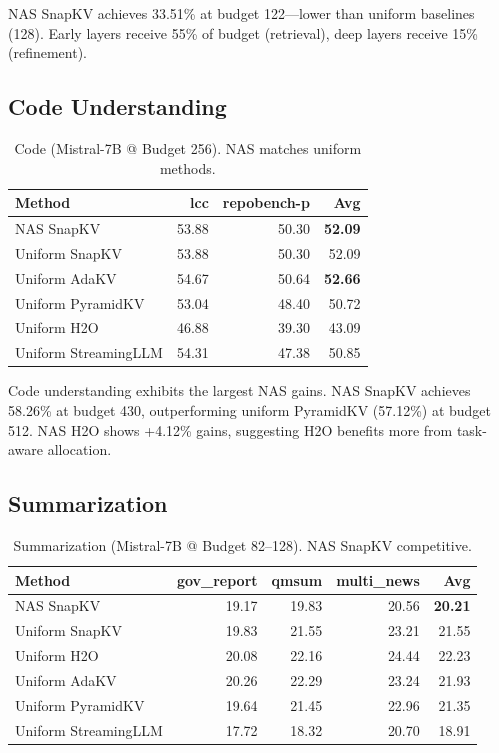 \documentclass[11pt]{article}
\begin{document}
NAS SnapKV achieves 33.51\% at budget 122—lower than uniform baselines (128). Early layers receive 55\% of budget (retrieval), deep layers receive 15\% (refinement).

\subsection{Code Understanding}

\begin{table}[h]
\centering
\footnotesize
\renewcommand{\arraystretch}{1.2}
\begin{tabular}{@{}l r r r@{}}
\toprule
\textbf{Method} & \textbf{lcc} & \textbf{repobench-p} & \textbf{Avg} \\
\midrule
NAS SnapKV & 53.88 & 50.30 & \textbf{52.09} \\
Uniform SnapKV & 53.88 & 50.30 & 52.09 \\
Uniform AdaKV & 54.67 & 50.64 & \textbf{52.66} \\
Uniform PyramidKV & 53.04 & 48.40 & 50.72 \\
Uniform H2O & 46.88 & 39.30 & 43.09 \\
Uniform StreamingLLM & 54.31 & 47.38 & 50.85 \\
\bottomrule
\end{tabular}
\caption{Code (Mistral-7B @ Budget 256). NAS matches uniform methods.}
\label{tab:code}
\end{table}

Code understanding exhibits the largest NAS gains. NAS SnapKV achieves 58.26\% at budget 430, outperforming uniform PyramidKV (57.12\%) at budget 512. NAS H2O shows +4.12\% gains, suggesting H2O benefits more from task-aware allocation.

\subsection{Summarization}

\begin{table}[h]
\centering
\footnotesize
\renewcommand{\arraystretch}{1.2}
\begin{tabular}{@{}l r r r r@{}}
\toprule
\textbf{Method} & \textbf{gov\_report} & \textbf{qmsum} & \textbf{multi\_news} & \textbf{Avg} \\
\midrule
NAS SnapKV & 19.17 & 19.83 & 20.56 & \textbf{20.21} \\
Uniform SnapKV & 19.83 & 21.55 & 23.21 & 21.55 \\
Uniform H2O & 20.08 & 22.16 & 24.44 & 22.23 \\
Uniform AdaKV & 20.26 & 22.29 & 23.24 & 21.93 \\
Uniform PyramidKV & 19.64 & 21.45 & 22.96 & 21.35 \\
Uniform StreamingLLM & 17.72 & 18.32 & 20.70 & 18.91 \\
\bottomrule
\end{tabular}
\caption{Summarization (Mistral-7B @ Budget 82–128). NAS SnapKV competitive.}
\label{tab:summarization}
\end{table}
\end{document}
